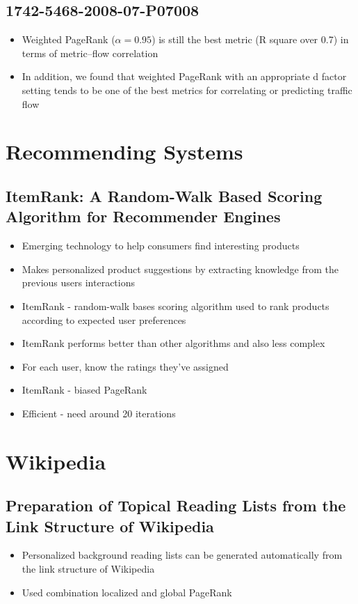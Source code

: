 \documentclass[11pt]{report}
\begin{document}
\subsection{1742-5468-2008-07-P07008}
\begin{itemize}
\item Weighted PageRank ($\alpha= 0.95$) is still the best metric (R square over 0.7) in terms of metric–flow correlation
\item In addition, we found that weighted PageRank with an
appropriate d factor setting tends to be one of the best metrics for correlating or predicting
traffic flow
\end{itemize}
\section{Recommending Systems}
\subsection{ItemRank: A Random-Walk Based Scoring Algorithm for Recommender Engines}
\begin{itemize}
\item Emerging technology to help consumers find interesting products
\item Makes personalized product suggestions by extracting knowledge from the previous users interactions
\item ItemRank - random-walk bases scoring algorithm used to rank products according to expected user preferences
\item ItemRank performs better than other algorithms and also less complex
\item For each user, know the ratings they've assigned
\item ItemRank - biased PageRank
\item Efficient - need around 20 iterations
\end{itemize}
\section{Wikipedia}
\subsection{Preparation of Topical Reading Lists from the Link Structure of Wikipedia}
\begin{itemize}
\item Personalized background reading lists can be generated automatically from the link structure of Wikipedia
\item Used combination localized and global PageRank
\end{itemize}
\end{document}
